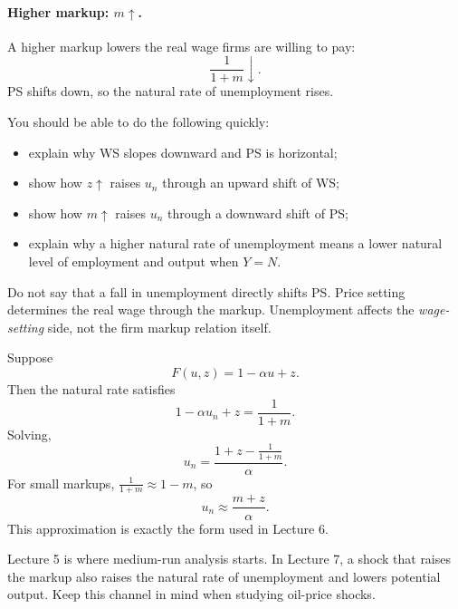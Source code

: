 \documentclass[12pt]{article}
\begin{document}
\paragraph{Higher markup: $m \uparrow$.}
A higher markup lowers the real wage firms are willing to pay:
\[
\frac{1}{1+m}\downarrow.
\]
PS shifts down, so the natural rate of unemployment rises.

\begin{examtip}[title={Exam Focus: High priority for short-answer}]
You should be able to do the following quickly:
\begin{itemize}[leftmargin=1.5em]
\item explain why WS slopes downward and PS is horizontal;
\item show how $z \uparrow$ raises $u_n$ through an upward shift of WS;
\item show how $m \uparrow$ raises $u_n$ through a downward shift of PS;
\item explain why a higher natural rate of unemployment means a lower natural level of employment and output when $Y=N$.
\end{itemize}
\end{examtip}

\begin{commonmistake}
Do not say that a fall in unemployment directly shifts PS. Price setting determines the real wage through the markup. Unemployment affects the \emph{wage-setting} side, not the firm markup relation itself.
\end{commonmistake}

\begin{examplebox}[title={Worked Example: Linear wage-setting form}]
Suppose
\[
F(u,z)=1-\alpha u+z.
\]
Then the natural rate satisfies
\[
1-\alpha u_n+z=\frac{1}{1+m}.
\]
Solving,
\[
u_n=\frac{1+z-\frac{1}{1+m}}{\alpha}.
\]
For small markups, $\frac{1}{1+m}\approx 1-m$, so
\[
u_n\approx \frac{m+z}{\alpha}.
\]
This approximation is exactly the form used in Lecture 6.
\end{examplebox}

\begin{examtip}[title={Exam Focus: Background assumed from IS--LM}]
Lecture 5 is where medium-run analysis starts. In Lecture 7, a shock that raises the markup also raises the natural rate of unemployment and lowers potential output. Keep this channel in mind when studying oil-price shocks.
\end{examtip}

\newpage
\end{document}
